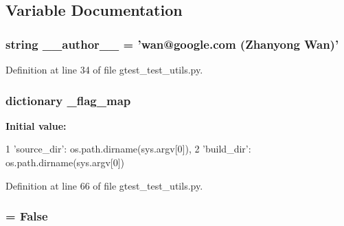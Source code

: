 \subsection{\-Variable \-Documentation}
\hypertarget{namespacegtest__test__utils_a629d61dfe4da763164a4d1a2d85b0afd}{
\subsubsection[{\-\_\-\-\_\-author\-\_\-\-\_\-}]{\setlength{\rightskip}{0pt plus 5cm}string {\bf \-\_\-\-\_\-author\-\_\-\-\_\-} = 'wan@google.\-com (\-Zhanyong \-Wan)'}}\label{d2/d4a/namespacegtest__test__utils_a629d61dfe4da763164a4d1a2d85b0afd}


\-Definition at line 34 of file gtest\-\_\-test\-\_\-utils.\-py.

\hypertarget{namespacegtest__test__utils_a248330712747692dbcce3fa978ed289e}{
\subsubsection[{\-\_\-flag\-\_\-map}]{\setlength{\rightskip}{0pt plus 5cm}dictionary {\bf \-\_\-flag\-\_\-map}}}\label{d2/d4a/namespacegtest__test__utils_a248330712747692dbcce3fa978ed289e}
{\bfseries \-Initial value\-:}
\begin{DoxyCode}
1 {'source_dir': os.path.dirname(sys.argv[0]),
2              'build_dir': os.path.dirname(sys.argv[0])}
\end{DoxyCode}


\-Definition at line 66 of file gtest\-\_\-test\-\_\-utils.\-py.

\hypertarget{namespacegtest__test__utils_a59c07e23a54adb665cbc6ffb8038bd8d}{
\subsubsection[{\-\_\-gtest\-\_\-flags\-\_\-are\-\_\-parsed}]{ = \-False}}\label{d2/d4a/namespacegtest__test__utils_a59c07e23a54adb665cbc6ffb8038bd8d}


